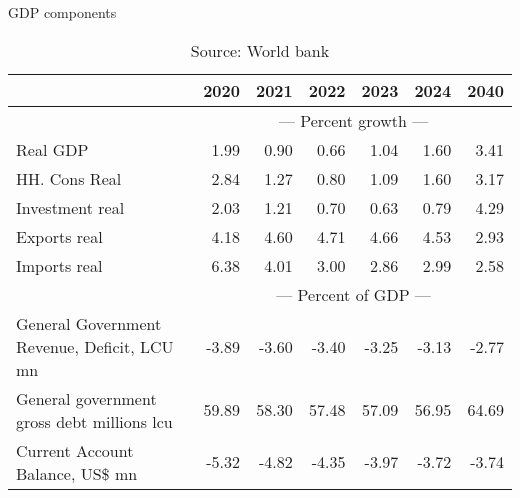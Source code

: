\documentclass{article}
\begin{document}
\begin{table}[ht]
\caption{GDP components}
\begin{tabular}{lrrrrr|r}
\toprule
 & 2020 & 2021 & 2022 & 2023 & 2024 & 2040 \\
\midrule
&\multicolumn{6}{c}{{---  Percent growth ---}}                               \\
Real GDP & 1.99 & 0.90 & 0.66 & 1.04 & 1.60 & 3.41 \\
HH. Cons Real & 2.84 & 1.27 & 0.80 & 1.09 & 1.60 & 3.17 \\
Investment real & 2.03 & 1.21 & 0.70 & 0.63 & 0.79 & 4.29 \\
Exports real & 4.18 & 4.60 & 4.71 & 4.66 & 4.53 & 2.93 \\
Imports real & 6.38 & 4.01 & 3.00 & 2.86 & 2.99 & 2.58 \\
&\multicolumn{6}{c}{{---  Percent of GDP ---}}                               \\
General Government Revenue, Deficit, LCU mn & -3.89 & -3.60 & -3.40 & -3.25 & -3.13 & -2.77 \\
General government gross debt millions lcu & 59.89 & 58.30 & 57.48 & 57.09 & 56.95 & 64.69 \\
Current Account Balance, US\$ mn & -5.32 & -4.82 & -4.35 & -3.97 & -3.72 & -3.74 \\
\bottomrule
\end{tabular}
\caption*{Source: World bank }
\end{table}
\end{document}
